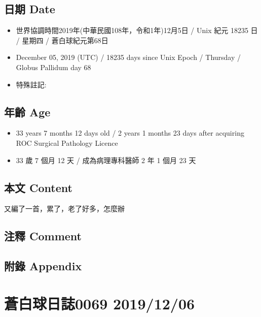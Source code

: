 \documentclass[a5paper, 12pt
]{book}
\providecommand{\tightlist}{%
  \setlength{\itemsep}{0pt}\setlength{\parskip}{0pt}}
\begin{document}
\hypertarget{ux65e5ux671f-date-4}{%
\subsection{日期 Date}\label{ux65e5ux671f-date-4}}

\begin{itemize}
\tightlist
\item
  世界協調時間2019年(中華民國108年，令和1年)12月5日 / Unix 紀元 18235 日
  / 星期四 / 蒼白球紀元第68日
\item
  December 05, 2019 (UTC) / 18235 days since Unix Epoch / Thursday /
  Globus Pallidum day 68
\item
  特殊註記:
\end{itemize}

\hypertarget{ux5e74ux9f61-age-4}{%
\subsection{年齡 Age}\label{ux5e74ux9f61-age-4}}

\begin{itemize}
\tightlist
\item
  33 years 7 months 12 days old / 2 years 1 months 23 days after
  acquiring ROC Surgical Pathology Licence
\item
  33 歲 7 個月 12 天 / 成為病理專科醫師 2 年 1 個月 23 天
\end{itemize}

\hypertarget{ux672cux6587-content-4}{%
\subsection{本文 Content}\label{ux672cux6587-content-4}}

又編了一首，累了，老了好多，怎麼辦

\hypertarget{ux6ce8ux91cb-comment-4}{%
\subsection{注釋 Comment}\label{ux6ce8ux91cb-comment-4}}

\hypertarget{ux9644ux9304-appendix-4}{%
\subsection{附錄 Appendix}\label{ux9644ux9304-appendix-4}}

\hypertarget{ux84bcux767dux7403ux65e5ux8a8c0069-20191206}{%
\section{蒼白球日誌0069
2019/12/06}\label{ux84bcux767dux7403ux65e5ux8a8c0069-20191206}}
\end{document}
